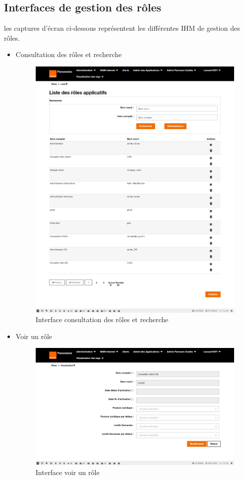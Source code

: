 \subsection{Interfaces de gestion des rôles}
les captures d'écran ci-dessous représentent les différentes IHM de gestion des rôles.
\begin{itemize}
	\item Consultation des rôles et recherche
	\begin{figure}[H]
		\centering
		\includegraphics[width=0.6\linewidth]{img/screenshots/roles/index}
		\caption[Interface consultation des rôles]{Interface consultation des rôles et recherche}
		\label{fig:index-roles}
	\end{figure}
	
	\item Voir un rôle
	\begin{figure}[H]
		\centering
		\includegraphics[width=0.6\linewidth]{img/screenshots/roles/view}
		\caption[Interface voir un rôle]{Interface voir un rôle}
		\label{fig:view-role}
	\end{figure}


\end{itemize}
